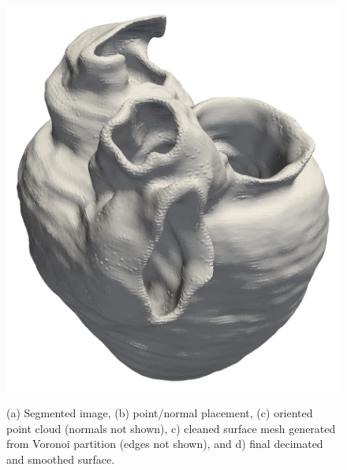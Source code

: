\begin{figure}[]
{		\includegraphics[scale=0.08]{media/2-shabaka/fine.png}
\label{fig:shabakaseq4}}
%
\caption{(a) Segmented image, (b) point/normal placement, (c) oriented point cloud (normals not shown), c) cleaned surface mesh generated from Voronoi partition (edges not shown), and d) final decimated and smoothed surface.}
\label{fig:shabakaseq}
\end{figure}


